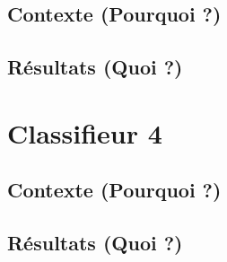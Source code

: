 \documentclass[12pt,a4paper]{report}
\begin{document}
\section{Contexte (Pourquoi ?)}
\section{Résultats (Quoi ?)}

\chapter{Classifieur 4}
\section{Contexte (Pourquoi ?)}
\section{Résultats (Quoi ?)}
\end{document}
